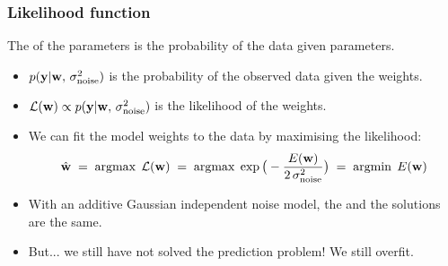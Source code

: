 \begin{frame}
\frametitle{Likelihood function}

The  of the parameters is the probability of the data given
 parameters.
\begin{itemize}
\item $p(\mathbf y|\mathbf w,\,\sigma_\mathrm{noise}^2)$ is the probability of the observed data given the 
weights.
\item $\mathcal{L}(\mathbf w)\propto p(\mathbf y|\mathbf w,\,\sigma_\mathrm{noise}^2)$ is the 
likelihood of the weights.
\end{itemize}

\vfill

\begin{itemize}
\item We can fit the model weights to the data by maximising the likelihood:
%
\[
\hat{\mathbf w}\;=\;\operatorname{argmax}\; \mathcal{L}(\mathbf w)
\;=\;\operatorname{argmax}\;\exp{\big(-\frac{E(\mathbf w)}{2\,\sigma_\mathrm{noise}^2}\big)}
\;=\;\operatorname{argmin}\; E(\mathbf w)
\]
%
\item With an additive Gaussian independent noise model, the  and the 
 solutions are the same.
\item But... we still have not solved the prediction problem! We still overfit.

\end{itemize}

\end{frame}
